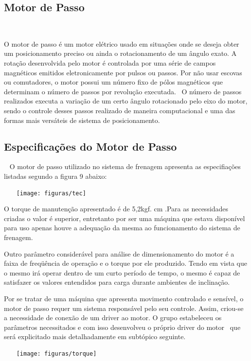 \subsection{Motor de Passo }  

O motor de passo é um motor elétrico usado em situações onde se deseja obter um posicionamento preciso ou ainda o rotacionamento de um ângulo exato. A rotação desenvolvida pelo motor é controlada por uma série de campos magnéticos emitidos eletronicamente por pulsos ou passos. Por não usar escovas ou comutadores, o motor possui um número fixo de pólos magnéticos que determinam o número de passos por revolução executada.  O número de passos realizados executa a variação de um certo ângulo rotacionado pelo eixo do motor, sendo o controle desses passos realizado de maneira computacional e uma das formas mais versáteis de sistema de posicionamento. 

\subsection{Especificações do Motor de Passo } 
 
O motor de passo utilizado no sistema de frenagem apresenta as especifiações listadas segundo a figura 9 abaixo:                       
\begin{center}
    \texttt{[image: figuras/tec]}
       \label{tec}
   \end{center}

O torque de manutenção apresentado é de 5,2kgf. cm .Para as necessidades criadas o valor é superior, entretanto por ser uma máquina que estava disponível para uso apenas houve a adequação da mesma ao funcionamento do sistema de frenagem. 

Outro parâmetro considerável para análise de dimensionamento do motor é a faixa de freqüência de operação e o torque por ele produzido. Tendo em vista que o mesmo irá operar dentro de um curto período de tempo, o mesmo é capaz de satisfazer os valores entendidos para carga durante ambientes de inclinação.

Por se tratar de uma máquina que apresenta movimento controlado e sensível, o motor de passo requer um sistema responsável pelo seu controle. Assim, criou-se a necessidade de conexão de um driver ao motor. O grupo estabeleceu os parâmetros necessitados e com isso desenvolveu o próprio driver do motor  que será explicitado mais detalhadamente em subtópico seguinte.       
      
\begin{center}
    \texttt{[image: figuras/torque]}
       \label{toque}
   \end{center}

